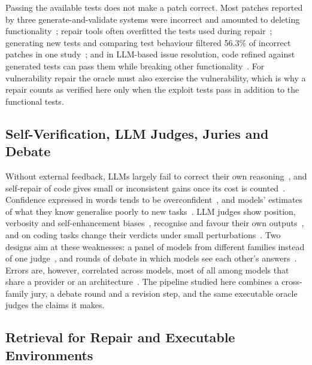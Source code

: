\documentclass[ai,article,submit,oneauthor]{Definitions/mdpi}
\begin{document}
Passing the available tests does not make a patch correct. Most patches reported by three generate-and-validate systems were incorrect and amounted to deleting functionality~\cite{Qi2015AnalysisOfPatch}; repair tools often overfitted the tests used during repair~\cite{Smith2015IsTheCure}; generating new tests and comparing test behaviour filtered 56.3\% of incorrect patches in one study~\cite{Xiong2018IdentifyingPatchCorrectness}; and in LLM-based issue resolution, code refined against generated tests can pass them while breaking other functionality~\cite{Ahmed2026InvestigatingTestOverfitting}. For vulnerability repair the oracle must also exercise the vulnerability, which is why a repair counts as verified here only when the exploit tests pass in addition to the functional tests.

\subsection{Self-Verification, LLM Judges, Juries and Debate}

Without external feedback, LLMs largely fail to correct their own reasoning~\cite{Huang2024LargeLanguageModels}, and self-repair of code gives small or inconsistent gains once its cost is counted~\cite{Olausson2024IsSelfRepair}. Confidence expressed in words tends to be overconfident~\cite{Xiong2024CanLlmsExpress}, and models' estimates of what they know generalise poorly to new tasks~\cite{Kadavath2022LanguageModelsMostly}. LLM judges show position, verbosity and self-enhancement biases~\cite{Zheng2023JudgingLlmAs}, recognise and favour their own outputs~\cite{Panickssery2024LlmEvaluatorsRecognize}, and on coding tasks change their verdicts under small perturbations~\cite{Jiang2026CodejudgebenchBenchmarkingLlm}. Two designs aim at these weaknesses: a panel of models from different families instead of one judge~\cite{Verga2024ReplacingJudgesWith}, and rounds of debate in which models see each other's answers~\cite{Du2024ImprovingFactualityAnd}. Errors are, however, correlated across models, most of all among models that share a provider or an architecture~\cite{Kim2025CorrelatedErrorsIn}. The pipeline studied here combines a cross-family jury, a debate round and a revision step, and the same executable oracle judges the claims it makes.

\subsection{Retrieval for Repair and Executable Environments}
\end{document}
